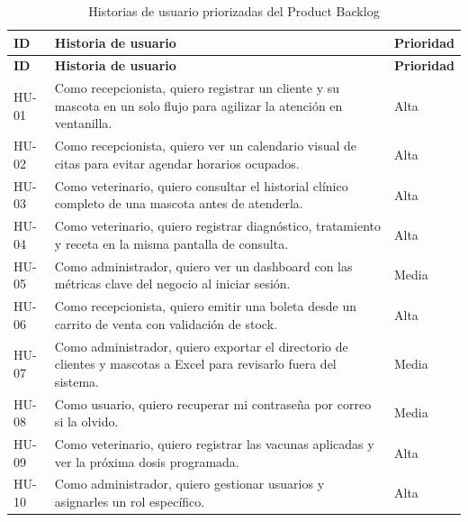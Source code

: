 \documentclass[11pt,a4paper]{report}
\begin{document}
\begin{longtable}{@{}p{1.3cm} p{11.3cm} p{2.4cm}@{}}
\caption{Historias de usuario priorizadas del Product Backlog}\label{tab:backlog}\\
\toprule
\textbf{ID} & \textbf{Historia de usuario} & \textbf{Prioridad} \\
\midrule
\endfirsthead
\toprule
\textbf{ID} & \textbf{Historia de usuario} & \textbf{Prioridad} \\
\midrule
\endhead
\bottomrule
\endfoot
HU-01 & Como recepcionista, quiero registrar un cliente y su mascota en un solo flujo para agilizar la atención en ventanilla. & Alta \\
\addlinespace
HU-02 & Como recepcionista, quiero ver un calendario visual de citas para evitar agendar horarios ocupados. & Alta \\
\addlinespace
HU-03 & Como veterinario, quiero consultar el historial clínico completo de una mascota antes de atenderla. & Alta \\
\addlinespace
HU-04 & Como veterinario, quiero registrar diagnóstico, tratamiento y receta en la misma pantalla de consulta. & Alta \\
\addlinespace
HU-05 & Como administrador, quiero ver un dashboard con las métricas clave del negocio al iniciar sesión. & Media \\
\addlinespace
HU-06 & Como recepcionista, quiero emitir una boleta desde un carrito de venta con validación de stock. & Alta \\
\addlinespace
HU-07 & Como administrador, quiero exportar el directorio de clientes y mascotas a Excel para revisarlo fuera del sistema. & Media \\
\addlinespace
HU-08 & Como usuario, quiero recuperar mi contraseña por correo si la olvido. & Media \\
\addlinespace
HU-09 & Como veterinario, quiero registrar las vacunas aplicadas y ver la próxima dosis programada. & Alta \\
\addlinespace
HU-10 & Como administrador, quiero gestionar usuarios y asignarles un rol específico. & Alta \\
\end{longtable}
\end{document}
